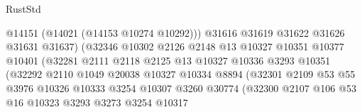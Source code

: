 \begin{lexlean}{RustStd}
\begin{coremodule}
                                        @14151
                                        (@14021 (@14153 @10274 @10292)))
                                      @31616
                                      @31619
                                      @31622
                                      @31626
                                      @31631
                                      @31637)
                                    (@32346
                                      @10302
                                      @2126
                                      @2148
                                      @13
                                      @10327
                                      @10351
                                      @10377
                                      @10401
                                      (@32281
                                        @2111
                                        @2118
                                        @2125
                                        @13
                                        @10327
                                        @10336
                                        @3293
                                        @10351
                                        (@32292
                                          @2110
                                          @1049
                                          @20038
                                          @10327
                                          @10334
                                          @8894
                                          (@32301
                                            @2109
                                            @53
                                            @55
                                            @3976
                                            @10326
                                            @10333
                                            @3254
                                            @10307
                                            @3260
                                            @30774
                                            (@32300
                                              @2107
                                              @106
                                              @53
                                              @16
                                              @10323
                                              @3293
                                              @3273
                                              @3254
                                              @10317

\end{coremodule}
\end{lexlean}
